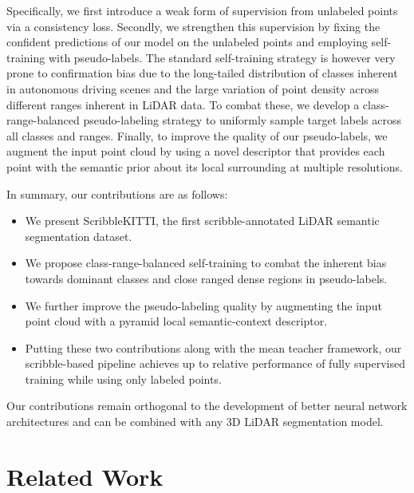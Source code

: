 \documentclass[10pt,twocolumn,letterpaper]{article}
\begin{document}
Specifically, we first introduce a weak form of supervision from unlabeled points via a consistency loss. Secondly, we strengthen this supervision by fixing the confident predictions of our model on the unlabeled points and employing self-training with pseudo-labels. The standard self-training strategy is however very prone to confirmation bias due to the long-tailed distribution of classes inherent in autonomous driving scenes and the large variation of point density across different ranges inherent in LiDAR data. To combat these, we develop a class-range-balanced pseudo-labeling strategy to uniformly sample target labels across all classes and ranges. Finally, to improve the quality of our pseudo-labels, we augment the input point cloud by using a novel descriptor that provides each point with the semantic prior about its local surrounding at multiple resolutions.

\noindent In summary, our contributions are as follows:
\begin{itemize}[noitemsep]
    \item We present ScribbleKITTI, the first scribble-annotated LiDAR semantic segmentation dataset.
    \item We propose class-range-balanced self-training to combat the inherent bias towards dominant classes and close ranged dense regions in pseudo-labels.
    \item We further improve the pseudo-labeling quality by augmenting the input point cloud with a pyramid local semantic-context descriptor.
    \item Putting these two contributions along with the mean teacher framework, our scribble-based pipeline achieves up to  relative performance of fully supervised training while using only  labeled points. 
 \end{itemize}
Our contributions remain orthogonal to the development of better neural network architectures and can be combined with any 3D LiDAR segmentation model.

\section{Related Work}
\end{document}
